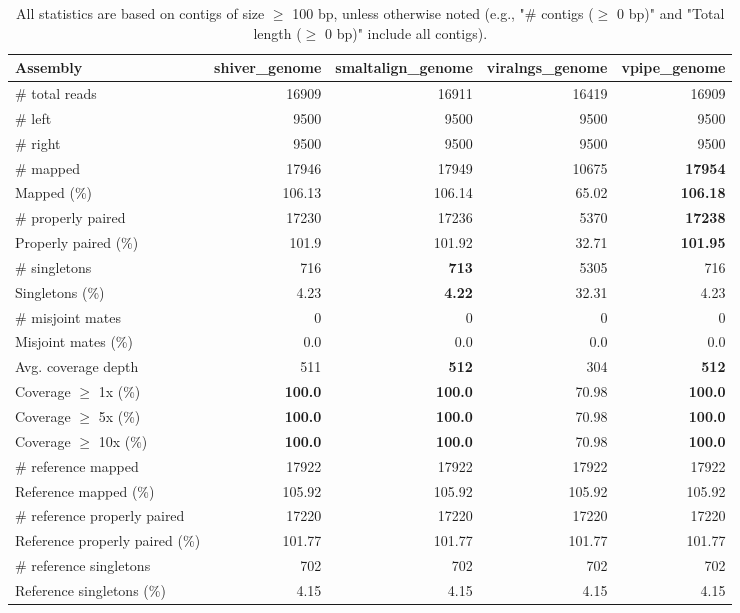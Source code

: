 \documentclass[12pt,a4paper]{article}
\begin{document}
\begin{table}[ht]
\begin{center}
\caption{All statistics are based on contigs of size $\geq$ 100 bp, unless otherwise noted (e.g., "\# contigs ($\geq$ 0 bp)" and "Total length ($\geq$ 0 bp)" include all contigs).}
\begin{tabular}{|l*{4}{|r}|}
\hline
Assembly & shiver\_genome & smaltalign\_genome & viralngs\_genome & vpipe\_genome \\ \hline
\# total reads & 16909 & 16911 & 16419 & 16909 \\ \hline
\# left & 9500 & 9500 & 9500 & 9500 \\ \hline
\# right & 9500 & 9500 & 9500 & 9500 \\ \hline
\# mapped & 17946 & 17949 & 10675 & {\bf 17954} \\ \hline
Mapped (\%) & 106.13 & 106.14 & 65.02 & {\bf 106.18} \\ \hline
\# properly paired & 17230 & 17236 & 5370 & {\bf 17238} \\ \hline
Properly paired (\%) & 101.9 & 101.92 & 32.71 & {\bf 101.95} \\ \hline
\# singletons & 716 & {\bf 713} & 5305 & 716 \\ \hline
Singletons (\%) & 4.23 & {\bf 4.22} & 32.31 & 4.23 \\ \hline
\# misjoint mates & 0 & 0 & 0 & 0 \\ \hline
Misjoint mates (\%) & 0.0 & 0.0 & 0.0 & 0.0 \\ \hline
Avg. coverage depth & 511 & {\bf 512} & 304 & {\bf 512} \\ \hline
Coverage $\geq$ 1x (\%) & {\bf 100.0} & {\bf 100.0} & 70.98 & {\bf 100.0} \\ \hline
Coverage $\geq$ 5x (\%) & {\bf 100.0} & {\bf 100.0} & 70.98 & {\bf 100.0} \\ \hline
Coverage $\geq$ 10x (\%) & {\bf 100.0} & {\bf 100.0} & 70.98 & {\bf 100.0} \\ \hline
\# reference mapped & 17922 & 17922 & 17922 & 17922 \\ \hline
Reference mapped (\%) & 105.92 & 105.92 & 105.92 & 105.92 \\ \hline
\# reference properly paired & 17220 & 17220 & 17220 & 17220 \\ \hline
Reference properly paired (\%) & 101.77 & 101.77 & 101.77 & 101.77 \\ \hline
\# reference singletons & 702 & 702 & 702 & 702 \\ \hline
Reference singletons (\%) & 4.15 & 4.15 & 4.15 & 4.15 \\ \hline

\end{tabular}
\end{center}
\end{table}
\end{document}
